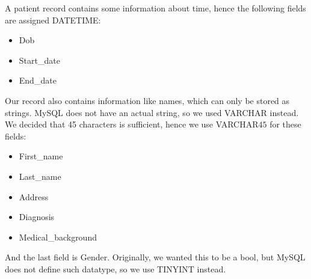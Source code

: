 \documentclass[a4paper]{article}
\numberwithin{equation}{section}
\begin{document}
A patient record contains some information about time, hence the following fields are assigned DATETIME:
\begin{itemize}
  \item Dob
  \item Start\_date
  \item End\_date
\end{itemize}

Our record also contains information like names, which can only be stored as strings. MySQL does not have an actual string, so we used VARCHAR instead.
We decided that 45 characters is sufficient, hence we use VARCHAR\(45\) for these fields:
\begin{itemize}
  \item First\_name
  \item Last\_name
  \item Address
  \item Diagnosis
  \item Medical\_background
\end{itemize}

And the last field is Gender.
Originally, we wanted this to be a bool, but MySQL does not define such datatype, so we use TINYINT instead.
\end{document}
